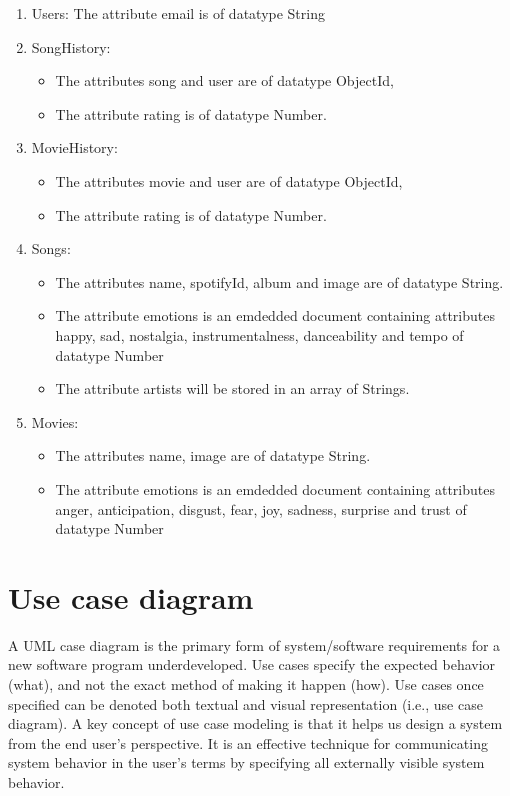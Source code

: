 \begin{enumerate}

\item Users: The attribute email is of datatype String

\item SongHistory:
	\begin{itemize}
		\item The attributes song and user are of datatype ObjectId,
		\item The attribute rating is of datatype Number.
	\end{itemize}

\item MovieHistory:
	\begin{itemize}
	\item The attributes movie and user are of datatype ObjectId,
	\item The attribute rating is of datatype Number.
	\end{itemize}


\item Songs:
	\begin{itemize}
		\item The attributes name, spotifyId, album and image are of datatype String.
		\item The attribute emotions is an emdedded document containing attributes happy, sad, nostalgia, instrumentalness, danceability and tempo of datatype Number
		\item The attribute artists will be stored in an array of Strings.
	\end{itemize}

\item Movies:
	\begin{itemize}
		\item The attributes name, image are of datatype String.
		\item The attribute emotions is an emdedded document containing attributes anger, anticipation, disgust, fear, joy, sadness, surprise and trust of datatype Number
	\end{itemize}
\end{enumerate}

\section{Use case diagram}
A UML case diagram is the primary form of system/software requirements for a new software program underdeveloped. Use cases specify the expected behavior (what), and not the exact method of making it happen (how). Use cases once specified can be denoted both textual and visual representation (i.e., use case diagram). A key concept of use case modeling is that it helps us design a system from the end user's perspective. It is an effective technique for communicating system behavior in the user's terms by specifying all externally visible system behavior.

